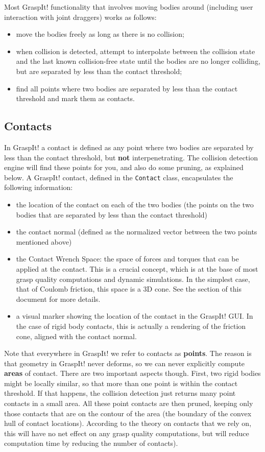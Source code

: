 Most GraspIt! functionality that involves moving bodies around
(including user interaction with joint draggers) works as follows:
\begin{itemize}
\item move the bodies freely as long as there is no collision;
\item when collision is detected, attempt to interpolate between the
  collision state and the last known collision-free state until the
  bodies are no longer colliding, but are separated by less than the
  contact threshold;
\item find all points where two bodies are separated by less than the
  contact threshold and mark them as contacts.
\end{itemize}

\subsection{Contacts}

In GraspIt! a contact is defined as any point where two bodies are
separated by less than the contact threshold, but \textbf{not}
interpenetrating. The collision detection engine will find these
points for you, and also do some pruning, as explained below. A
GraspIt! contact, defined in the \texttt{Contact} class, encapsulates
the following information:
\begin{itemize}
\item the location of the contact on each of the two bodies (the
  points on the two bodies that are separated by less than the contact
  threshold)
\item the contact normal (defined as the normalized vector between the
  two points mentioned above)
\item the Contact Wrench Space: the space of forces and torques that
  can be applied at the contact. This is a crucial concept, which is
  at the base of most grasp quality computations and dynamic
  simulations. In the simplest case, that of Coulomb friction, this
  space is a 3D cone. See the 
  section of this document for more details.
\item a visual marker showing the location of the contact in the
  GraspIt! GUI. In the case of rigid body contacts, this is actually a
  rendering of the friction cone, aligned with the contact normal.
\end{itemize}

Note that everywhere in GraspIt! we refer to contacts as
\textbf{points}. The reason is that geometry in GraspIt! never
deforms, so we can never explicitly compute \textbf{areas} of
contact. There are two important aspects though. First, two rigid
bodies might be locally similar, so that more than one point is within
the contact threshold. If that happens, the collision detection just
returns many point contacts in a small area. All these point contacts
are then pruned, keeping only those contacts that are on the contour
of the area (the boundary of the convex hull of contact
locations). According to the theory on contacts that we rely on, this
will have no net effect on any grasp quality computations, but will
reduce computation time by reducing the number of contacts).

